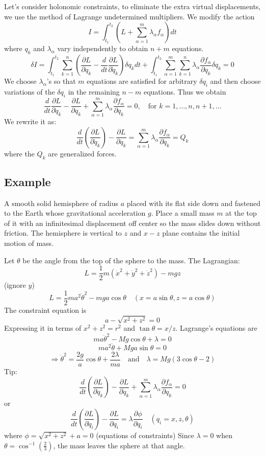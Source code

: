 \documentclass[12pt]{article}
\begin{document}
	Let's consider holonomic constraints, to eliminate the extra virtual displacements, we use the method of Lagrange undetermined multipliers.
	We modify the action
	$$ I = \int_{t_1}^{t_2} (L + \sum_{\alpha=1}^{m} \lambda_{\alpha} f_{\alpha}) dt $$
	where $q_k$ and $\lambda_{\alpha}$ vary independently to obtain $n+m$ equations.
	$$ \delta I = \int_{t_1}^{t_2} \sum_{k=1}^{n} (\frac{\partial L}{\partial q_k} - \frac{d}{dt}\frac{\partial L}{\partial \dot{q}_k}) \delta q_k dt + \int_{t_1}^{t_2} \sum_{\alpha=1}^{m} \sum_{k=1}^{n} \lambda_{\alpha} \frac{\partial f_{\alpha}}{\partial q_k} \delta q_k = 0 $$
	We choose $\lambda_{\alpha}$'s so that $m$ equations are satisfied for arbitrary $\delta q_i$ and then choose variations of the $\delta q_i$ in the remaining $n-m$ equations. Thus we obtain
	$$ \frac{d}{dt} \frac{\partial L}{\partial \dot{q}_k} - \frac{\partial L}{\partial q_k} + \sum_{\alpha=1}^{m} \lambda_{\alpha} \frac{\partial f_{\alpha}}{\partial q_k} = 0, \quad \text{for } k=1, \dots, n, n+1, \dots $$
	We rewrite it as:
	$$ \frac{d}{dt}(\frac{\partial L}{\partial \dot{q}_k}) - \frac{\partial L}{\partial q_k} = \sum_{\alpha=1}^{m} \lambda_{\alpha} \frac{\partial f_{\alpha}}{\partial q_k} = Q_k $$
	where the $Q_k$ are generalized forces.
	
	\subsection*{Example}
	A smooth solid hemisphere of radius $a$ placed with its flat side down and fastened to the Earth whose gravitational acceleration $g$. Place a small mass $m$ at the top of it with an infinitesimal displacement off center so the mass slides down without friction. The hemisphere is vertical to $z$ and $x-z$ plane contains the initial motion of mass.
	
	Let $\theta$ be the angle from the top of the sphere to the mass.
	The Lagrangian:
	$$ L = \frac{1}{2} m (\dot{x}^2 + \dot{y}^2 + \dot{z}^2) - mgz $$
	(ignore $y$)
	$$ L = \frac{1}{2} m a^2 \dot{\theta}^2 - mga \cos\theta \quad (x = a \sin\theta, z = a \cos\theta) $$
	The constraint equation is
	$$ a - \sqrt{x^2+z^2} = 0 $$
	Expressing it in terms of $x^2+z^2=r^2$ and $\tan\theta = x/z$.
	Lagrange's equations are
	$$ m a \ddot{\theta}^2 - Mg \cos\theta + \lambda = 0 $$
	$$ m a^2 \ddot{\theta} + Mg a \sin\theta = 0 $$
	$$ \Rightarrow \ddot{\theta}^2 = \frac{2g}{a} \cos\theta + \frac{2\lambda}{ma} \quad \text{and} \quad \lambda = Mg(3\cos\theta - 2) $$
	Tip:
	$$ \frac{d}{dt}(\frac{\partial L}{\partial q_k}) - \frac{\partial L}{\partial q_k} + \sum_{\alpha=1}^{m} \lambda_{\alpha} \frac{\partial f_{\alpha}}{\partial q_k} = 0 $$
	or
	$$ \frac{d}{dt}(\frac{\partial L}{\partial \dot{q}_i}) - \frac{\partial L}{\partial q_i} = \lambda \frac{\partial \phi}{\partial q_i} \quad (q_i = x, z, \theta) $$
	where $\phi = \sqrt{x^2+z^2} + a = 0$ (equations of constraints)
	Since $\lambda=0$ when $\theta = \cos^{-1}(\frac{2}{3})$, the mass leaves the sphere at that angle.
	
\end{document}
